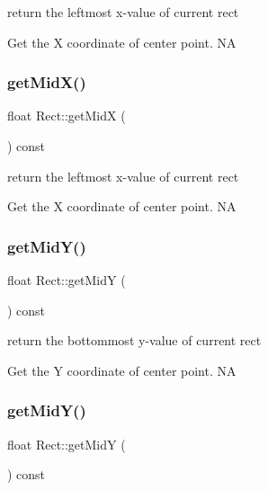 return the leftmost x-\/value of current rect 

Get the X coordinate of center point.  NA \mbox{\label{classRect_a0d644f512a90863b28d73c445113702b}} 
\subsubsection{\texorpdfstring{get\+Mid\+X()}{getMidX()}\hspace{0.1cm}{\footnotesize\ttfamily [2/2]}}
{\footnotesize\ttfamily float Rect\+::get\+MidX (\begin{DoxyParamCaption}{ }\end{DoxyParamCaption}) const}



return the leftmost x-\/value of current rect 

Get the X coordinate of center point.  NA \mbox{\label{classRect_a7454d7f94e0903740ed119f1cb780733}} 
\subsubsection{\texorpdfstring{get\+Mid\+Y()}{getMidY()}\hspace{0.1cm}{\footnotesize\ttfamily [1/2]}}
{\footnotesize\ttfamily float Rect\+::get\+MidY (\begin{DoxyParamCaption}{ }\end{DoxyParamCaption}) const}



return the bottommost y-\/value of current rect 

Get the Y coordinate of center point.  NA \mbox{\label{classRect_a7454d7f94e0903740ed119f1cb780733}} 
\subsubsection{\texorpdfstring{get\+Mid\+Y()}{getMidY()}\hspace{0.1cm}{\footnotesize\ttfamily [2/2]}}
{\footnotesize\ttfamily float Rect\+::get\+MidY (\begin{DoxyParamCaption}{ }\end{DoxyParamCaption}) const}




